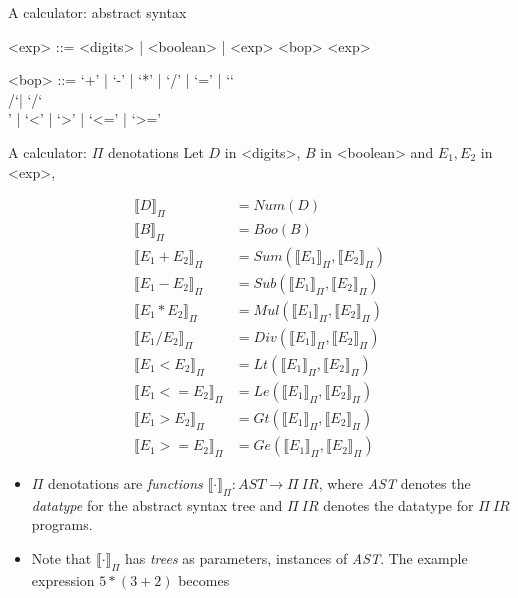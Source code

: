 \documentclass{beamer}
\newcommand{\BS}{\char`\\}
\begin{document}

\begin{frame}[fragile]{A calculator: abstract syntax}
\begin{grammar}
<exp> ::= <digits> | <boolean> | <exp> <bop> <exp> 

<bop> ::= `+' | `-' | `*' | `/' | `=' | `\BS/`| `/\BS' | `<' | `>' | `<=' | `>=' 
\end{grammar}
\end{frame}


\begin{frame}{A calculator: {\color{red}$\Pi$} denotations}
Let $D$ in <digits>, $B$ in <boolean> and $E_1, E_2$ in <exp>,

\begin{footnotesize}
\begin{align}
\label{eq:dig}\llbracket D \rrbracket_{\Pi} & = Num(D) \\
\llbracket B \rrbracket_{\Pi} & = Boo(B) \\
\label{eq:add}\llbracket E_1 + E_2 \rrbracket_{\Pi} & = Sum(\llbracket E_1 \rrbracket_{\Pi}, \llbracket E_2 \rrbracket_{\Pi}) \\
\llbracket E_1 - E_2 \rrbracket_{\Pi} & = Sub(\llbracket E_1 \rrbracket_{\Pi}, \llbracket E_2 \rrbracket_{\Pi}) \\
\label{eq:mul}\llbracket E_1 * E_2 \rrbracket_{\Pi} & = Mul(\llbracket E_1 \rrbracket_{\Pi}, \llbracket E_2 \rrbracket_{\Pi}) \\
\llbracket E_1 / E_2 \rrbracket_{\Pi} & = Div(\llbracket E_1 \rrbracket_{\Pi}, \llbracket E_2 \rrbracket_{\Pi}) \\
\llbracket E_1 < E_2 \rrbracket_{\Pi} & = Lt(\llbracket E_1 \rrbracket_{\Pi}, \llbracket E_2 \rrbracket_{\Pi}) \\
\llbracket E_1 {<=} E_2 \rrbracket_{\Pi} & = Le(\llbracket E_1 \rrbracket_{\Pi}, \llbracket E_2 \rrbracket_{\Pi}) \\
\llbracket E_1 > E_2 \rrbracket_{\Pi} & = Gt(\llbracket E_1 \rrbracket_{\Pi}, \llbracket E_2 \rrbracket_{\Pi}) \\
\llbracket E_1 {>\!=} E_2 \rrbracket_{\Pi} & = Ge(\llbracket E_1 \rrbracket_{\Pi}, \llbracket E_2 \rrbracket_{\Pi}) 
\end{align}
\end{footnotesize}

\framebreak 

\begin{itemize}
\item {\color{red}$\Pi$} denotations are \emph{functions} $\llbracket \cdot \rrbracket_\Pi : \mathit{AST} \to \Pi \ \mathit{IR}$, where 
\emph{AST} denotes the \emph{datatype} for the abstract syntax tree and $\Pi \ \mathit{IR}$ denotes the datatype for {\color{red}$\Pi \ \mathit{IR}$} programs. 
\item Note that $\llbracket \cdot \rrbracket_\Pi$ has \emph{trees} as parameters, instances of \emph{AST}. The example expression $5 * (3 + 2)$ becomes


\end{itemize}
\end{frame}
\end{document}
